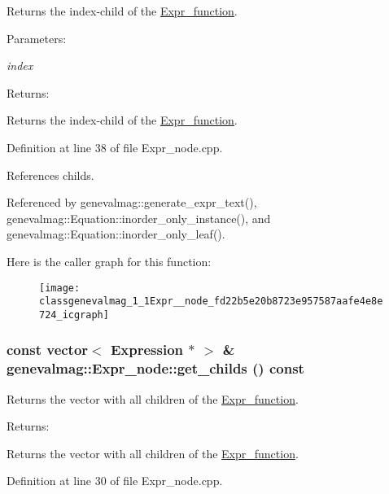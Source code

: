 Returns the index-child of the \hyperlink{classgenevalmag_1_1Expr__function}{Expr\_\-function}. \begin{Desc}
\item[Parameters:]
\begin{description}
\item[{\em index}]\end{description}
\end{Desc}
\begin{Desc}
\item[Returns:]\end{Desc}
Returns the index-child of the \hyperlink{classgenevalmag_1_1Expr__function}{Expr\_\-function}. 

Definition at line 38 of file Expr\_\-node.cpp.

References childs.

Referenced by genevalmag::generate\_\-expr\_\-text(), genevalmag::Equation::inorder\_\-only\_\-instance(), and genevalmag::Equation::inorder\_\-only\_\-leaf().

Here is the caller graph for this function:\nopagebreak
\begin{figure}[H]
\begin{center}
\leavevmode
\texttt{[image: classgenevalmag\_1\_1Expr\_\_node\_fd22b5e20b8723e957587aafe4e8e724\_icgraph]}
\end{center}
\end{figure}
\hypertarget{classgenevalmag_1_1Expr__node_35298ede3bb76a765ce4367a589383cc}{
\subsubsection[{get\_\-childs}]{\setlength{\rightskip}{0pt plus 5cm}const vector$<$ {\bf Expression} $\ast$ $>$ \& genevalmag::Expr\_\-node::get\_\-childs () const}}
\label{classgenevalmag_1_1Expr__node_35298ede3bb76a765ce4367a589383cc}


Returns the vector with all children of the \hyperlink{classgenevalmag_1_1Expr__function}{Expr\_\-function}. \begin{Desc}
\item[Returns:]\end{Desc}
Returns the vector with all children of the \hyperlink{classgenevalmag_1_1Expr__function}{Expr\_\-function}. 

Definition at line 30 of file Expr\_\-node.cpp.

